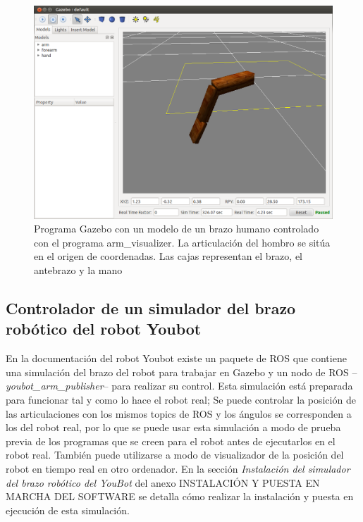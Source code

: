 \documentclass[12pt, a4paper]{report}
\begin{document}
\begin{figure}[h]
	\centering
		\includegraphics[scale=0.3]{../img/arm_visualizer.png} 
	\caption[Programa Gazebo con un modelo de un brazo humano]{Programa Gazebo con un modelo de un brazo humano controlado con el programa arm\_visualizer. La articulación del hombro se sitúa en el origen de coordenadas. Las cajas representan el brazo, el antebrazo y la mano} 
	\label{fig: arm_visualizer}
\end{figure}

\subsection{Controlador de un simulador del brazo robótico del robot Youbot}

En la documentación del robot Youbot existe un paquete de ROS que contiene una simulación del brazo del robot para trabajar en Gazebo y un nodo de ROS --\textit{youbot\_arm\_publisher}-- para realizar su control. Esta simulación está preparada para funcionar tal y como lo hace el robot real; Se puede controlar la posición de las articulaciones con los mismos topics de ROS y los ángulos se corresponden a los del robot real, por lo que se puede usar esta simulación a modo de prueba previa de los programas que se creen para el robot antes de ejecutarlos en el robot real. También puede utilizarse a modo de visualizador de la posición del robot en tiempo real en otro ordenador. En la sección \textit{Instalación del simulador del brazo robótico del YouBot} del anexo INSTALACIÓN Y PUESTA EN MARCHA DEL SOFTWARE se detalla cómo realizar la instalación y puesta en ejecución de esta simulación.
\end{document}
